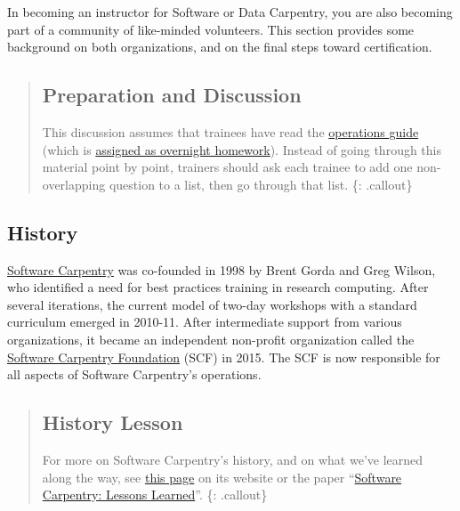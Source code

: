 
In becoming an instructor for Software or Data Carpentry, you are also
becoming part of a community of like-minded volunteers. This section
provides some background on both organizations, and on the final steps
toward certification.

\begin{quote}
\subsection{Preparation and Discussion}\label{preparation-and-discussion}

This discussion assumes that trainees have read the
\href{\{\{\%20site.swc\_site\%20\}\}/workshops/operations/}{operations
guide} (which is \href{\{\{\%20page.root\%20\}\}/12-summarize/}{assigned
as overnight homework}). Instead of going through this material point by
point, trainers should ask each trainee to add one non-overlapping
question to a list, then go through that list. \{: .callout\}
\end{quote}

\subsection{History}\label{history}

\href{\{\{\%20site.swc\_site\%20\}\}}{Software Carpentry} was co-founded
in 1998 by Brent Gorda and Greg Wilson, who identified a need for best
practices training in research computing. After several iterations, the
current model of two-day workshops with a standard curriculum emerged in
2010-11. After intermediate support from various organizations, it
became an independent non-profit organization called the
\href{\{\{\%20site.swc\_site\%20\}\}/scf/}{Software Carpentry Foundation}
(SCF) in 2015. The SCF is now responsible for all aspects of Software
Carpentry's operations.

\begin{quote}
\subsection{History Lesson}\label{history-lesson}

For more on Software Carpentry's history, and on what we've learned
along the way, see
\href{\{\{\%20site.swc\_site\%20\}\}/scf/history/}{this page} on its
website or the paper
``\href{http://f1000research.com/articles/3-62/v2}{Software Carpentry:
Lessons Learned}''. \{: .callout\}
\end{quote}

